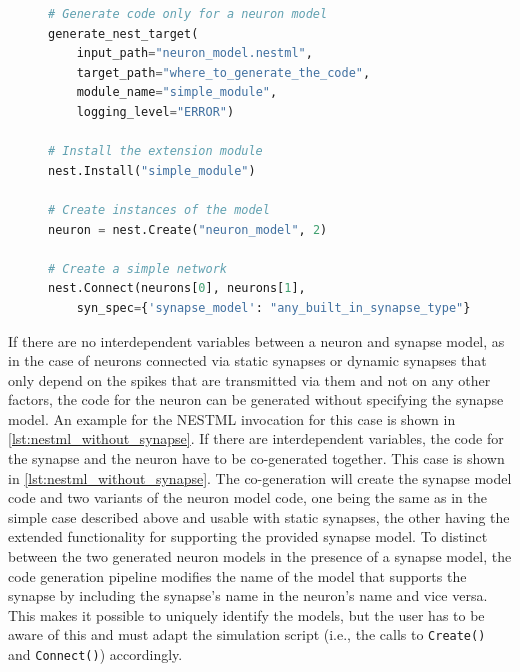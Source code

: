 \vspace{2em}
\begin{figure}[ht!]
\centering
\begin{lstlisting}[language=Python, label=lst:nestml_without_synapse, caption={Generating extension module code: The \texttt{generate\_nest\_target} function generates code only for a neuron model. The minimum required parameter of the function is the \texttt{input\_path} that points to the location of the model. Once the code is generated, the built libraries can be loaded into NEST using the \texttt{Install} function by providing the name of the module (\emph{simple\_module}). Once the model is installed in NEST, we can create instances of the model by calling the \texttt{Create()} function with the model name being the name that was written in the NESTML file in the neuron block.}, captionpos=b]
# Generate code only for a neuron model
generate_nest_target(
    input_path="neuron_model.nestml",
    target_path="where_to_generate_the_code",
    module_name="simple_module",
    logging_level="ERROR")

# Install the extension module
nest.Install("simple_module")

# Create instances of the model
neuron = nest.Create("neuron_model", 2)

# Create a simple network
nest.Connect(neurons[0], neurons[1],
    syn_spec={'synapse_model': "any_built_in_synapse_type"})
\end{lstlisting}
\end{figure}

If there are no interdependent variables between a neuron and synapse model, as in the case of neurons connected via static synapses or dynamic synapses that only depend on the spikes that are transmitted via them and not on any other factors, the code for the neuron can be generated without specifying the synapse model. An example for the NESTML invocation for this case is shown in \autoref{lst:nestml_without_synapse}. If there are interdependent variables, the code for the synapse and the neuron have to be co-generated together. This case is shown in \autoref{lst:nestml_without_synapse}. The co-generation will create the synapse model code and two variants of the neuron model code, one being the same as in the simple case described above and usable with static synapses, the other having the extended functionality for supporting the provided synapse model. To distinct between the two generated neuron models in the presence of a synapse model, the code generation pipeline modifies the name of the model that supports the synapse by including the synapse's name in the neuron's name and vice versa. This makes it possible to uniquely identify the models, but the user has to be aware of this and must adapt the simulation script (i.e., the calls to \texttt{Create()} and \texttt{Connect()}) accordingly.

